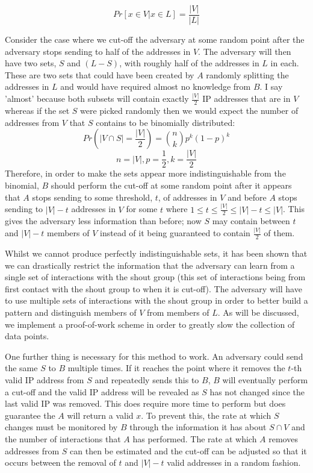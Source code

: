 \documentclass[ %
                    author={Luke Murray},
                supervisor={Dr. Simon Hollis},
                     title={Shadow Peer-to-Peer Networks},
                  subtitle={},
                    degree={MEng},
                      year={2013} ]{thesis}
\begin{document}
\[Pr[x \in V | x \in L] = \frac{|V|}{|L|}\]

Consider the case where we cut-off the adversary at some random point after the adversary stops sending to half of the addresses in $V$. The adversary will then have two sets, $S$ and $(L - S)$, with roughly half of the addresses in $L$ in each. These are two sets that could have been created by $A$ randomly splitting the addresses in $L$ and would have required almost no knowledge from $B$. I say 'almost' because both subsets will contain exactly $\frac{|V|}{2}$ IP addresses that are in $V$ whereas if the set $S$ were picked randomly then we would expect the number of addresses from $V$ that $S$ contains to be binomially distributed: \[Pr(|V \cap S| = \frac{|V|}{2}) = {n \choose k}p^{k}(1-p)^{k}\]\[n = |V|, p = \frac{1}{2}, k = \frac{|V|}{2}\] Therefore, in order to make the sets appear more indistinguishable from the binomial, $B$ should perform the cut-off at some random point after it appears that $A$ stops sending to some threshold, $t$, of addresses in $V$ and before $A$ stops sending to $|V| - t$ addresses in $V$ for some $t$ where $1 \leq t \leq \frac{|V|}{2} \leq |V| - t \leq |V|$. This gives the adversary less information than before; now $S$ may contain between $t$ and $|V| - t$ members of $V$ instead of it being guaranteed to contain $\frac{|V|}{2}$ of them.

Whilst we cannot produce perfectly indistinguishable sets, it has been shown that we can drastically restrict the information that the adversary can learn from a single set of interactions with the shout group (this set of interactions being from first contact with the shout group to when it is cut-off). The adversary will have to use multiple sets of interactions with the shout group in order to better build a pattern and distinguish members of $V$ from members of $L$. As will be discussed, we implement a proof-of-work scheme in order to greatly slow the collection of data points.

One further thing is necessary for this method to work. An adversary could send the same $S$ to $B$ multiple times. If it reaches the point where it removes the $t$-th valid IP address from $S$ and repeatedly sends this to $B$, $B$ will eventually perform a cut-off and the valid IP address will be revealed as $S$ has not changed since the last valid IP was removed. This does require more time to perform but does guarantee the $A$ will return a valid $x$. To prevent this, the rate at which $S$ changes must be monitored by $B$ through the information it has about $S \cap V$ and the number of interactions that $A$ has performed. The rate at which $A$ removes addresses from $S$ can then be estimated and the cut-off can be adjusted so that it occurs between the removal of $t$ and $|V| - t$ valid addresses in a random fashion.
\end{document}
